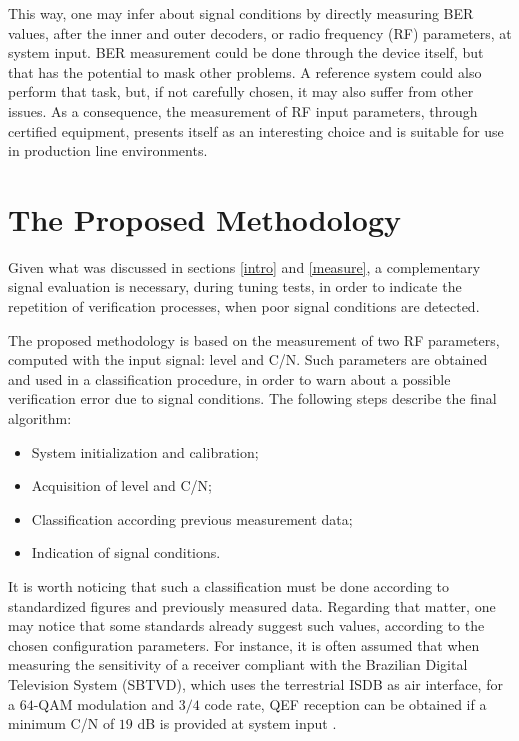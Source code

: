 \documentclass[conference]{IEEEtran}
\begin{document}
This way, one may infer about signal conditions by directly measuring BER values, after the inner and outer decoders, or radio frequency (RF) parameters, at system input. BER measurement could be done through the device itself, but that has the potential to mask other problems. A reference system could also perform that task, but, if not carefully chosen, it may also suffer from other issues. As a consequence, the measurement of RF input parameters, through certified equipment, presents itself as an interesting choice and is suitable for use in production line environments.

\section{The Proposed Methodology}\label{metho}
Given what was discussed in sections \ref{intro} and \ref{measure}, a complementary signal evaluation is necessary, during tuning tests, in order to indicate the repetition of verification processes, when poor signal conditions are detected. 

The proposed methodology is based on the measurement of two RF parameters, computed with the input signal: level and C/N. Such parameters are obtained and used in a classification procedure, in order to warn about a possible verification error due to signal conditions. The following steps describe the final algorithm:

\begin{itemize}
	\item System initialization and calibration;
	\item Acquisition of level and C/N;
	\item Classification according previous measurement data;
	\item Indication of signal conditions.
\end{itemize}

It is worth noticing that such a classification must be done according to standardized figures and previously measured data. Regarding that matter, one may notice that some standards already suggest such values, according to the chosen configuration parameters. For instance, it is often assumed that when measuring the sensitivity of a receiver compliant with the Brazilian Digital Television System (SBTVD), which uses the terrestrial ISDB as air interface, for a $64$-QAM modulation and $3/4$ code rate, QEF reception can be obtained if a minimum C/N of $19$ dB is provided at system input \cite{sbtvd}. 
\end{document}
